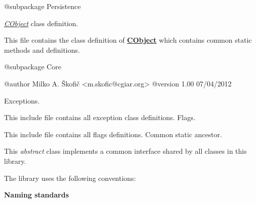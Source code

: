 \begin{DoxyVerb}    @subpackage     Persistence\end{DoxyVerb}


{\itshape \hyperlink{class_c_object}{C\-Object}\/} class definition.

This file contains the class definition of {\bfseries \hyperlink{class_c_object}{C\-Object}} which contains common static methods and definitions.

\begin{DoxyVerb}    @subpackage     Core

    @author         Milko A. Škofič <m.skofic@cgiar.org>
    @version        1.00 07/04/2012\end{DoxyVerb}


Exceptions.

This include file contains all exception class definitions. Flags.

This include file contains all flags definitions. Common static ancestor.

This {\itshape abstract\/} class implements a common interface shared by all classes in this library.

The library uses the following conventions\-:

{\bfseries Naming standards}


